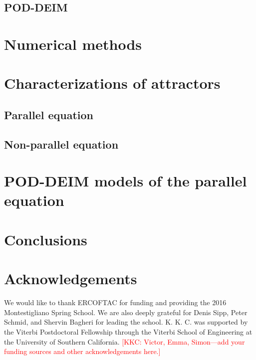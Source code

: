 \documentclass[11pt]{article}
\newcommand{\kkc}[1]{\textcolor{red}{[KKC: #1]}}
\begin{document}
\subsection{POD-DEIM}

\section{Numerical methods}
\label{sec:methods}

\cite{WeidemanACMTMS00}
\cite{HechtJNM12}

\section{Characterizations of attractors}
\label{sec:attractors}

\subsection{Parallel equation}


\subsection{Non-parallel equation}

\section{POD-DEIM models of the parallel equation}
\label{sec:pod-deim}

\section{Conclusions}
\label{sec:conclusions}

\section{Acknowledgements}

We would like to thank ERCOFTAC for funding and providing the 2016 Montestigliano Spring School.
We are also deeply grateful for Denis Sipp, Peter Schmid, and Shervin Bagheri for leading the school.
K. K. C. was supported by the Viterbi Postdoctoral Fellowship through the Viterbi School of Engineering at the University of Southern California.
\kkc{Victor, Emma, Simon---add your funding sources and other acknowledgements here.}


\end{document}
